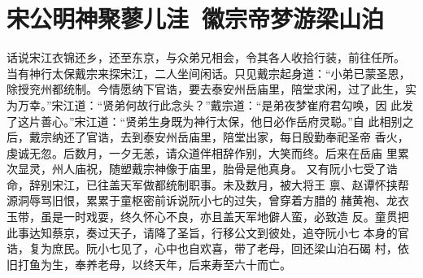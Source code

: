\chapter{宋公明神聚蓼儿洼~徽宗帝梦游梁山泊}

话说宋江衣锦还乡，还至东京，与众弟兄相会，令其各人收拾行装，前往任所。
当有神行太保戴宗来探宋江，二人坐间闲话。只见戴宗起身道：“小弟已蒙圣恩，
除授兖州都统制。今情愿纳下官诰，要去泰安州岳庙里，陪堂求闲，过了此生，实
为万幸。”宋江道：“贤弟何故行此念头？”戴宗道：“是弟夜梦崔府君勾唤，因
此发了这片善心。”宋江道：“贤弟生身既为神行太保，他日必作岳府灵聪。”自
此相别之后，戴宗纳还了官诰，去到泰安州岳庙里，陪堂出家，每日殷勤奉祀圣帝
香火，虔诚无忽。后数月，一夕无恙，请众道伴相辞作别，大笑而终。后来在岳庙
里累次显灵，州人庙祝，随塑戴宗神像于庙里，胎骨是他真身。
又有阮小七受了诰命，辞别宋江，已往盖天军做都统制职事。未及数月，被大将王
禀、赵谭怀挟帮源洞辱骂旧恨，累累于童枢密前诉说阮小七的过失，曾穿着方腊的
赭黄袍、龙衣玉带，虽是一时戏耍，终久怀心不良，亦且盖天军地僻人蛮，必致造
反。童贯把此事达知蔡京，奏过天子，请降了圣旨，行移公文到彼处，追夺阮小七
本身的官诰，复为庶民。阮小七见了，心中也自欢喜，带了老母，回还梁山泊石碣
村，依旧打鱼为生，奉养老母，以终天年，后来寿至六十而亡。

